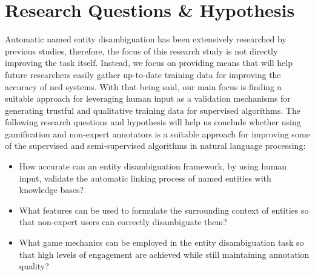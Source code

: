 \section{Research Questions \& Hypothesis}
Automatic named entity disambiguation has been extensively researched by previous studies, therefore, the focus of this research study is not directly improving the task itself. Instead, we focus on providing means that will help future researchers easily gather up-to-date training data for improving the accuracy of \ac{ned} systems. With that being said, our main focus is finding a suitable approach for leveraging human input as a validation mechanisms for generating trustful and qualitative training data for supervised algorithms. The following research questions and hypothesis will help us conclude whether using gamification and non-expert annotators is a suitable approach for improving some of the supervised and semi-supervised algorithms in natural language processing:  
\begin{itemize}
    \item How accurate can an entity disambiguation framework, by using human input, validate the automatic linking process of named entities with knowledge bases?
    \item  What features can be used to formulate the surrounding context of entities so that non-expert users can correctly disambiguate them? 
    \item What game mechanics can be employed in the entity disambiguation task so that high levels of engagement are achieved while still maintaining annotation quality?
\end{itemize}

